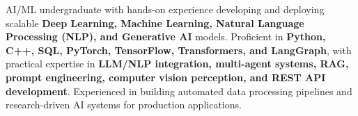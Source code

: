 AI/ML undergraduate with hands-on experience developing and deploying scalable \textbf{Deep Learning, Machine Learning, Natural Language Processing (NLP), and Generative AI} models. Proficient in \textbf{Python, C++, SQL, PyTorch, TensorFlow, Transformers, and LangGraph}, with practical expertise in \textbf{LLM/NLP integration, multi-agent systems, RAG, prompt engineering, computer vision perception, and REST API development}. Experienced in building automated data processing pipelines and research-driven AI systems for production applications.
